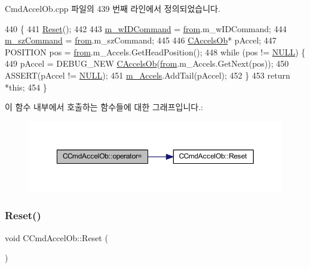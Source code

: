 Cmd\+Accel\+Ob.\+cpp 파일의 439 번째 라인에서 정의되었습니다.


\begin{DoxyCode}
440 \{
441   \mbox{\hyperlink{class_c_cmd_accel_ob_ac679e57ed400b175109af50ea2ce919d}{Reset}}();
442   
443   \mbox{\hyperlink{class_c_cmd_accel_ob_aa3eb02dcd39ff14763fdefd8fabd7591}{m\_wIDCommand}} = \mbox{\hyperlink{expr_8cpp_a765533dfc643627999c751f7e1514664}{from}}.m\_wIDCommand;
444   \mbox{\hyperlink{class_c_cmd_accel_ob_acbd02cc68d3909b1e39b687e76f45d91}{m\_szCommand}} = \mbox{\hyperlink{expr_8cpp_a765533dfc643627999c751f7e1514664}{from}}.m\_szCommand;
445   
446   \mbox{\hyperlink{class_c_accels_ob}{CAccelsOb}}* pAccel;
447   POSITION pos = \mbox{\hyperlink{expr_8cpp_a765533dfc643627999c751f7e1514664}{from}}.m\_Accels.GetHeadPosition();
448   \textcolor{keywordflow}{while} (pos != \mbox{\hyperlink{getopt1_8c_a070d2ce7b6bb7e5c05602aa8c308d0c4}{NULL}}) \{
449     pAccel = DEBUG\_NEW \mbox{\hyperlink{class_c_accels_ob}{CAccelsOb}}(\mbox{\hyperlink{expr_8cpp_a765533dfc643627999c751f7e1514664}{from}}.m\_Accels.GetNext(pos));
450     ASSERT(pAccel != \mbox{\hyperlink{getopt1_8c_a070d2ce7b6bb7e5c05602aa8c308d0c4}{NULL}});
451     \mbox{\hyperlink{class_c_cmd_accel_ob_a85772f1ea9204af42b8a39a0135dc0f8}{m\_Accels}}.AddTail(pAccel);
452   \}
453   \textcolor{keywordflow}{return} *\textcolor{keyword}{this};
454 \}
\end{DoxyCode}
이 함수 내부에서 호출하는 함수들에 대한 그래프입니다.\+:
\nopagebreak
\begin{figure}[H]
\begin{center}
\leavevmode
\includegraphics[width=350pt]{class_c_cmd_accel_ob_a045ce00d2465fefed857066eef1406a7_cgraph}
\end{center}
\end{figure}
\mbox{\label{class_c_cmd_accel_ob_ac679e57ed400b175109af50ea2ce919d}} 
\subsubsection{\texorpdfstring{Reset()}{Reset()}}
{\footnotesize\ttfamily void C\+Cmd\+Accel\+Ob\+::\+Reset (\begin{DoxyParamCaption}{ }\end{DoxyParamCaption})}



